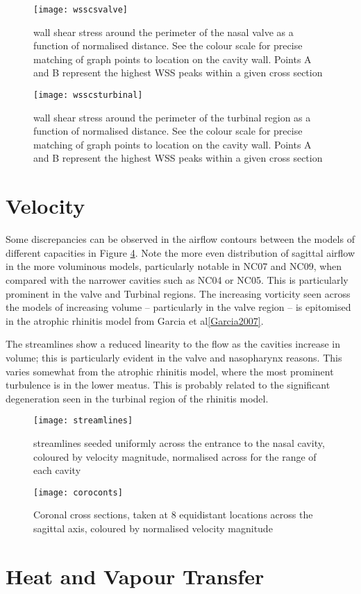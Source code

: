 \begin{figure} \label{fig:wcs}
  \texttt{[image: wsscsvalve]}
  \caption{wall shear stress around the perimeter of the nasal valve as a function of normalised distance. See the colour scale for precise matching of graph points to location on the cavity wall. Points A and B represent the highest WSS peaks within a given cross section}
\end{figure}

\begin{figure} \label{fig:wcst}
  \texttt{[image: wsscsturbinal]}
  \caption{wall shear stress around the perimeter of the turbinal region as a function of normalised distance. See the colour scale for precise matching of graph points to location on the cavity wall. Points A and B represent the highest WSS peaks within a given cross section}
\end{figure}

\section{Velocity}

Some discrepancies can be observed in the airflow contours between the models of different capacities in Figure \ref{fig:vcc}. Note the more even distribution of sagittal airflow in the more voluminous models, particularly notable in NC07 and NC09, when compared with the narrower cavities such as NC04 or NC05. This is particularly prominent in the valve and Turbinal regions. The increasing vorticity seen across the models of increasing volume – particularly in the valve region – is epitomised in the atrophic rhinitis model from Garcia et al\ref{Garcia2007}.

The streamlines show a reduced linearity to the flow as the cavities increase in volume; this is particularly evident in the valve and nasopharynx reasons. This varies somewhat from the atrophic rhinitis model, where the most prominent turbulence is in the lower meatus. This is probably related to the significant degeneration seen in the turbinal region of the rhinitis model.

\begin{figure} \label{fig:vsl}
  \texttt{[image: streamlines]}
  \caption{streamlines seeded uniformly across the entrance to the nasal cavity, coloured by velocity magnitude, normalised across for the range of each cavity}
\end{figure}

\begin{figure} \label{fig:vcc}
  \texttt{[image: coroconts]}
  \caption{Coronal cross sections, taken at 8 equidistant locations across the sagittal axis, coloured by normalised velocity magnitude}
\end{figure}

\section{Heat and Vapour Transfer}

